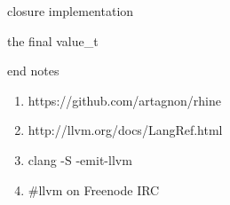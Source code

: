\documentclass{beamer}
\begin{document}
\begin{frame}{closure implementation}
  
\end{frame}

\begin{frame}{the final value\_t}
  
\end{frame}

\begin{frame}{end notes}
  \begin{enumerate}
  \item https://github.com/artagnon/rhine
  \item http://llvm.org/docs/LangRef.html
  \item clang -S -emit-llvm
  \item \#llvm on Freenode IRC
  \end{enumerate}
\end{frame}
\end{document}
